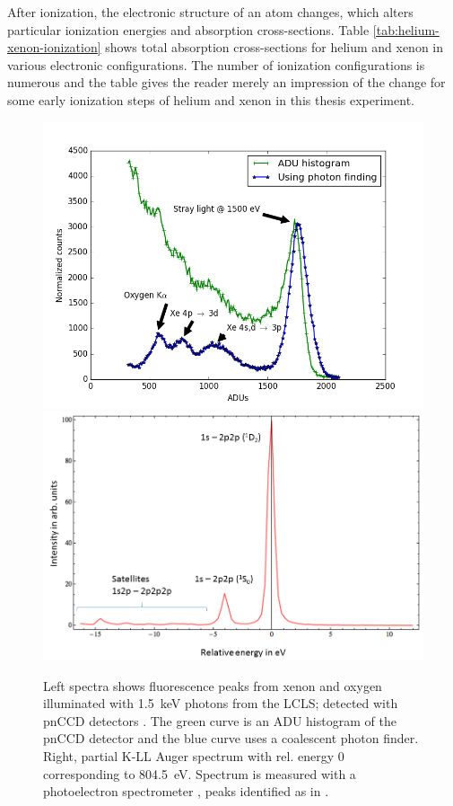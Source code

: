 After ionization, the electronic structure of an atom changes, which alters particular ionization energies and absorption cross-sections. Table \ref{tab:helium-xenon-ionization} shows total absorption cross-sections for helium and xenon in various electronic configurations. The number of ionization configurations is numerous and the table gives the reader merely an impression of the change for some early ionization steps of helium and xenon in this thesis experiment.\\[1\baselineskip]
%
%
%
\begin{figure}
	\centering
		\includegraphics[width=.49\textwidth]{images/pnCCD-histogram.png}
		\includegraphics[width=.49\textwidth]{images/auger-spectra.png}
	\caption[Fluorescence peaks from xenon and neon K-LL Auger spectrum.]{Left spectra shows fluorescence peaks from xenon and oxygen illuminated with \SI{1.5}{\kilo\electronvolt} photons from the LCLS; detected with pnCCD detectors \citep{Bucher-2016-Unpublished, Rudek-2012-NatPho}. The green curve is an ADU histogram of the pnCCD detector and the blue curve uses a coalescent photon finder. Right, partial K-LL Auger spectrum with rel. energy 0 corresponding to \SI{804.5}{\electronvolt}. Spectrum is measured with a photoelectron spectrometer \citep{Bucher-2014-Unpublished}, peaks identified as in \citep{Krause-1970-PhysLettA}.}
	\label{fig:pnCCD-histogram}
\end{figure}
%
